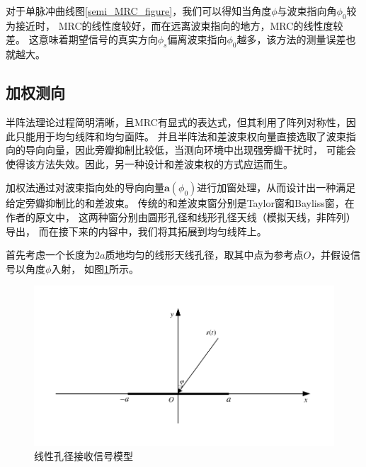 \documentclass[master]{thesis-uestc}
\begin{document}
对于单脉冲曲线图\ref{semi_MRC_figure}，我们可以得知当角度$\phi$与波束指向角$\phi_0$较为接近时，
MRC的线性度较好，而在远离波束指向的地方，MRC的线性度较差。
这意味着期望信号的真实方向$\phi_s$偏离波束指向$\phi_0$越多，该方法的测量误差也就越大。

\subsection{加权测向}
半阵法理论过程简明清晰，且MRC有显式的表达式，但其利用了阵列对称性，因此只能用于均匀线阵和均匀面阵。
并且半阵法和差波束权向量直接选取了波束指向的导向向量，因此旁瓣抑制比较低，当测向环境中出现强旁瓣干扰时，
可能会使得该方法失效。因此，另一种设计和差波束权的方式应运而生。

加权法通过对波束指向处的导向向量$\bm{a}(\phi_0)$进行加窗处理，从而设计出一种满足给定旁瓣抑制比的和差波束。
传统的和差波束窗分别是Taylor窗和Bayliss窗，在作者的原文中，
这两种窗分别由圆形孔径和线形孔径天线（模拟天线，非阵列）导出，
而在接下来的内容中，我们将其拓展到均匀线阵上。

首先考虑一个长度为$2a$质地均匀的线形天线孔径，取其中点为参考点$O$，并假设信号以角度$\phi$入射，
如图\ref{linear_aperture}所示。
\begin{figure}[h]
    \includegraphics[scale=0.8]{pic/linear_aperture.pdf}
    \caption{线性孔径接收信号模型}
    \label{linear_aperture}
\end{figure}
\end{document}
